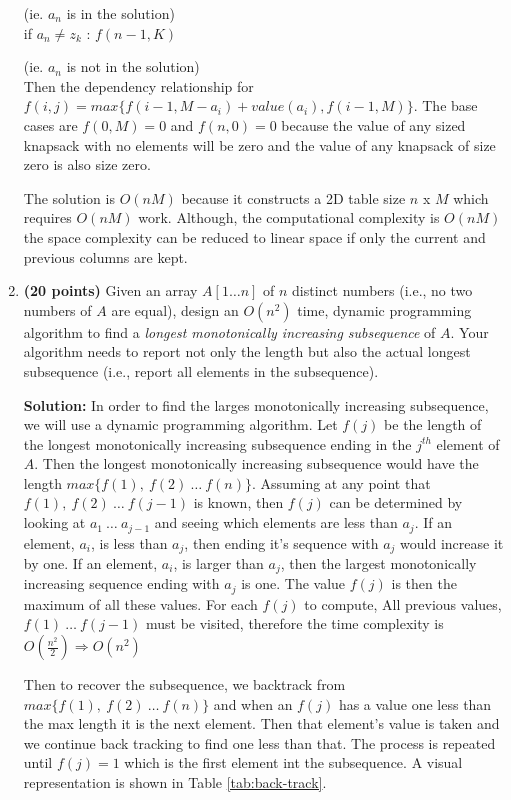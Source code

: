 \documentclass[11pt]{article}
\begin{document}
\begin{enumerate}
(ie. $a_n$ is in the solution)\\

if $a_n \neq z_k$ : \hfill $f(n-1, K)$

(ie. $a_n$ is not in the solution)\\

Then the dependency relationship for $f(i, j) = max\{ f(i-1, M-a_i) + value(a_i), f(i-1, M) \}$. The base cases are $f(0, M) = 0$ and $f(n, 0) = 0$ because the value of any sized knapsack with no elements will be zero and the value of any knapsack of size zero is also size zero.

The solution is $O(nM)$ because it constructs a 2D table size $n$ x $M$ which requires $O(nM)$ work. Although, the computational complexity is $O(nM)$ the space complexity can be reduced to linear space if only the current and previous columns are kept.

\item
{ \bf (20 points)}
Given an array $A[1\ldots n]$ of $n$ distinct numbers (i.e., no two numbers of $A$ are equal),
design an $O(n^2)$ time, dynamic programming algorithm to find a {\em longest monotonically
increasing subsequence} of $A$. Your algorithm needs to report not only the length but also
the actual longest subsequence (i.e., report all elements in the subsequence).

{\bf Solution:} In order to find the larges monotonically increasing subsequence, we will use a
dynamic programming algorithm. Let $f(j)$ be the length of the longest
monotonically increasing subsequence ending in the $j^{th}$ element of $A$.
Then the longest monotonically increasing subsequence would have the length
$max\{f(1),\ f(2)\ \ldots\ f(n)\}$. Assuming at any point that $f(1),\ f(2)\ \ldots\ f(j-1)$
is known, then $f(j)$ can be determined by looking at $a_1\ \ldots\ a_{j-1}$
and seeing which elements are less than $a_j$. If an element, $a_i$, is less than $a_j$,
then ending it's sequence with $a_j$ would increase it by one. If an element, $a_i$, is
larger than $a_j$, then the largest monotonically increasing sequence ending with $a_j$
is one. The value $f(j)$ is then the maximum of all these values. For each $f(j)$
to compute, All previous values, $f(1)\ \ldots\ f(j-1)$ must be visited, therefore
the time complexity is $O(\frac{n^2}{2}) \Rightarrow O(n^2)$

Then to recover the subsequence, we backtrack from $max\{f(1),\ f(2)\ \ldots\ f(n)\}$
and when an $f(j)$ has a value one less than the max length it is the next element.
Then that element's value is taken and we continue back tracking to find one
less than that. The process is repeated until $f(j) = 1$ which is the first element
int the subsequence. A visual representation is shown in Table \ref{tab:back-track}.


\end{enumerate}
\end{document}
